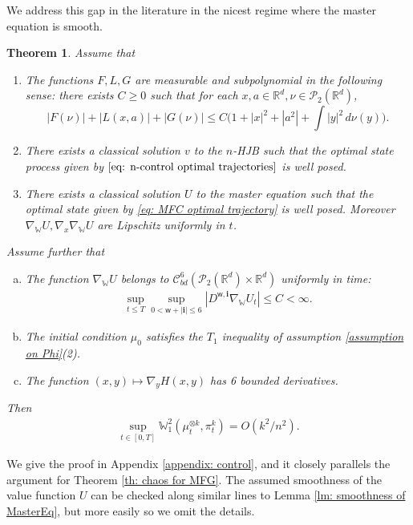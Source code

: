 \documentclass[11pt,reqno]{amsart}
\numberwithin{equation}{section}
\newtheorem{theorem}{Theorem}[section]
\theoremstyle{definition}
\def\R{{\mathbb R}}
\newcommand{\wgrad}{\nabla_{\W}}
\newcommand{\W}{\mathbb W}
\begin{document}
We address this gap in the literature in the nicest regime where the master equation is smooth. 
\begin{theorem}
\label{th: chaos for control}
    Assume that
    \begin{enumerate}
    \item The functions $F,L,G$ are measurable and subpolynomial in the following sense: there exists $C\geq 0$ such that for each $x,a \in \R^d, \nu \in \mathcal P_2(\R^d)$,
    \begin{equation*}
        |F(\nu)|+|L(x,a)|+|G(\nu)|\leq C\Big(1+|x|^2+|a^2|+\int |y|^2\,d\nu(y)\Big).
    \end{equation*}
         \item There exists a classical solution $v$ to the $n$-HJB such that the optimal state process given by $\eqref{eq: n-control optimal trajectories}$ is well posed.
         \item  There exists a classical solution $U$ to the master equation such that the optimal state given by \eqref{eq: MFC optimal trajectory} is well posed. Moreover $\wgrad U,\nabla_x \wgrad U$ are Lipschitz uniformly in $t$.
     \end{enumerate}
    Assume further that
    \begin{enumerate}[(a)]
        \item The function $\wgrad U$ belongs to $\mathcal C_{bd}^{6}(\mathcal P_2(\R^d)\times \R^d)$ uniformly in time:
        \begin{align*}
            \sup_{t\leq T}\sup_{0<\mathsf w +|\boldsymbol{i}|\leq 6}|D^{\mathsf w,\boldsymbol{i}}\wgrad U_t|\leq C<\infty.
        \end{align*}
        \item The initial condition $\mu_0$ satisfies the $T_1$ inequality of assumption \ref{assumption on Phi}(2).
        \item The function $(x,y)\mapsto \nabla_y H(x,y)$ has 6 bounded derivatives.
    \end{enumerate}
    Then 
\begin{align*}
    \sup_{t \in [0,T]}\W^2_1(\mu_t^{\otimes k},\pi_t^k) = O(k^2/n^2).
\end{align*}
\end{theorem}

We give the proof in Appendix \ref{appendix: control}, and it closely parallels the argument for Theorem \ref{th: chaos for MFG}. The assumed smoothness of the value function $U$ can be checked along similar lines to Lemma \ref{lm: smoothness of MasterEq}, but more easily so we omit the details.
\end{document}
